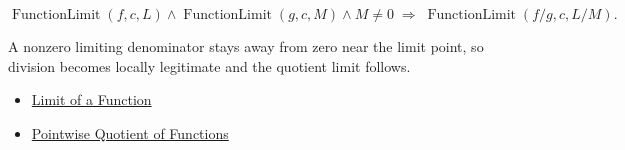 \begin{remark*}
\[
  \operatorname{FunctionLimit}(f,c,L)\wedge\operatorname{FunctionLimit}(g,c,M)\wedge M\neq 0
  \;\Longrightarrow\;
  \operatorname{FunctionLimit}(f/g,c,L/M).
\]
\end{remark*}

\begin{remark*}[Interpretation]
A nonzero limiting denominator stays away from zero near the limit point,
so division becomes locally legitimate and the quotient limit follows.
\end{remark*}

\begin{dependencies}
\begin{itemize}
  \item \hyperref[def:limit-function]{Limit of a Function}
  \item \hyperref[def:pointwise-quotient-of-functions]{Pointwise Quotient of Functions}
\end{itemize}
\end{dependencies}
